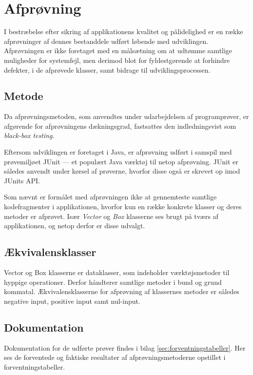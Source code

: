 \section{Afprøvning}
\label{sec:afproevning}
I bestræbelse efter sikring af applikationens kvalitet og pålidelighed er en række afprøvninger af dennes bestanddele udført løbende med udviklingen. Afprøvningen er ikke foretaget med en målsætning om at udtømme samtlige muligheder for systemfejl, men derimod blot for fyldestgørende at forhindre defekter, i de afprøvede klasser, samt bidrage til udviklingsprocessen.

\subsection{Metode}
\label{subsec:metode}
Da afprøvningsmetoden, som anvendtes under udarbejdelsen af programprøver, er afgørende for afprøvningens dækningsgrad, fastsattes den indledningsvist som \emph{black-box testing}. 

Eftersom udviklingen er foretaget i Java, er afprøvning udført i samspil med prøvemiljøet JUnit --- et populært Java værktøj til netop afprøvning. JUnit er således anvendt under kørsel af prøverne, hvorfor disse også er skrevet op imod JUnits API.

Som nævnt er formålet med afprøvningen ikke at gennemteste samtlige kodefragmenter i applikationen, hvorfor kun en række konkrete klasser og deres metoder er afprøvet. Især \emph{Vector} og \emph{Box} klasserne ses brugt på tværs af applikationen, og netop derfor er disse udvalgt.

\subsection{Ækvivalensklasser}
\label{subsec:aekvivalensklasser}
Vector og Box klasserne er dataklasser, som indeholder værktøjsmetoder til hyppige operationer. Derfor håndterer samtlige metoder i bund og grund kommatal. Ækvivalensklasserne for afprøvning af klassernes metoder er således negative input, positive input samt nul-input.

\subsection{Dokumentation}
\label{subsec:dokumentation}
Dokumentation for de udførte prøver findes i bilag \ref{sec:forventningstabeller}. Her ses de forventede og faktiske resultater af afprøvningsmetoderne opstillet i forventningstabeller.